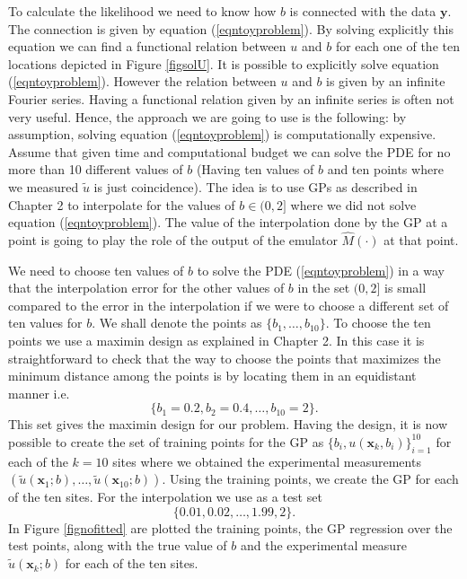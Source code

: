 \documentclass[12pt]{book}
\newcommand{\x}{\textbf{x}}
\newcommand{\y}{\textbf{y}}
\begin{document}
To calculate the likelihood we need to know how $b$ is connected with the data $\y$. The connection is given by 
equation (\ref{eqntoyproblem}). By solving explicitly this equation we can find a functional relation
between $u$ and $b$ for each one of the ten locations depicted in Figure \ref{figsolU}.
It is possible to explicitly solve equation (\ref{eqntoyproblem}). However
the relation between $u$ and $b$ is  given by an infinite Fourier series. Having a functional relation given
by an infinite series is often not very useful. Hence, the  approach we are going to use is the following: 
by assumption,
solving equation (\ref{eqntoyproblem}) is computationally expensive. Assume that given time and computational budget
we can solve the PDE for no more than 10 different values of $b$ (Having ten values of $b$ and ten points
where we measured $\tilde{u}$ is just coincidence). The idea is to use GPs as described
in Chapter 2 to interpolate for the values of $b\in (0,2]$ where we did not  solve equation (\ref{eqntoyproblem}). The value
of the interpolation done by the GP at a point is going to play the role of the output of the   emulator $\hat{M}(\cdot)$ at that point.
\newline

We need to choose ten values of $b$  to solve the PDE (\ref{eqntoyproblem}) in a way that the interpolation error for 
the other values of $b$ in the set $(0,2]$ is small compared to the error in the interpolation if we were to choose
a different set of ten values for $b$. We shall denote the points as $\{b_{1},\dots,b_{10}\}$. To choose the ten points 
we use a maximin design as explained in Chapter 2. In this case
it is straightforward to check that the way to choose the points that maximizes the minimum distance among the points
is by locating them in an equidistant manner i.e.
\begin{equation*}
\{b_{1}=0.2,b_{2}=0.4,\ldots,b_{10}=2\}.
\end{equation*}
This set gives the maximin design for our problem.
\newline 
Having the design, it is now possible to  create the set of training points for the GP as 
$\{b_{i},u(\x_{k},b_{i})\}_{i=1}^{10}$ for each of the 
$k=10$ sites where we obtained the experimental measurements $(\tilde{u}(\x_{1};b),\ldots,\tilde{u}(\x_{10};b))$.
 Using the training
points, we create the GP for each of the ten sites. For the interpolation we use as a test set
\begin{equation*}
\{0.01,0.02,\ldots,1.99,2\}.
\end{equation*} 
In Figure \ref{fignofitted} are plotted the training points, 
the GP regression over the test points, along with the true value of $b$
and the experimental measure $\tilde{u}(\x_{k};b)$ for each of the ten sites.
\end{document}
